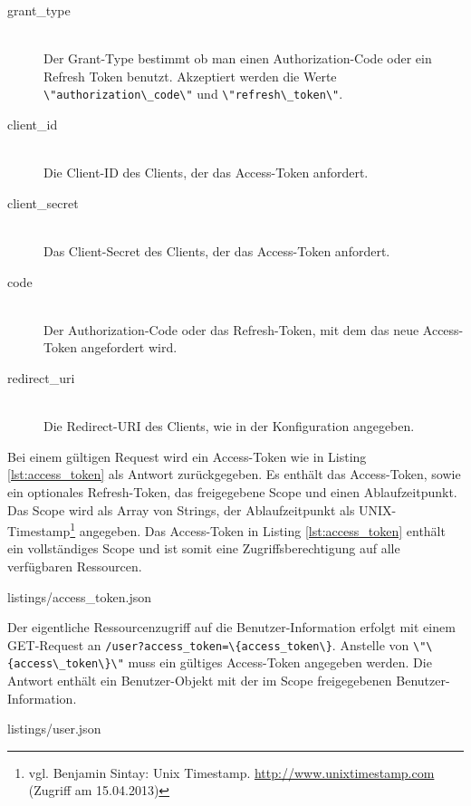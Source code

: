 \documentclass[12pt,a4paper,pointednumbers,abstracton]{scrartcl}
\newcommand{\code}[1]{\small\lstinline[style=InlinePHP]!#1!\normalsize}
\begin{document}
\begin{description}
	\item[grant\_type] \hfill \\
		Der Grant-Type bestimmt ob man einen Authorization-Code oder ein Refresh Token benutzt.
		Akzeptiert werden die Werte \code{\"authorization\_code\"} und \code{\"refresh\_token\"}.
	\item[client\_id] \hfill \\
		Die Client-ID des Clients, der das Access-Token anfordert.
	\item[client\_secret] \hfill \\
		Das Client-Secret des Clients, der das Access-Token anfordert.
	\item[code] \hfill \\
		Der Authorization-Code oder das Refresh-Token, mit dem das neue Access-Token angefordert wird.
	\item[redirect\_uri] \hfill \\
		Die Redirect-URI des Clients, wie in der Konfiguration angegeben.
\end{description}

Bei einem gültigen Request wird ein Access-Token wie in Listing \ref{lst:access_token} als Antwort zurückgegeben.
Es enthält das Access-Token, sowie ein optionales Refresh-Token, das freigegebene Scope und einen Ablaufzeitpunkt.
Das Scope wird als Array von Strings, der Ablaufzeitpunkt als UNIX-Timestamp\footnote{vgl. Benjamin Sintay: Unix Timestamp. \url{http://www.unixtimestamp.com} (Zugriff am 15.04.2013)} angegeben.
Das Access-Token in Listing \ref{lst:access_token} enthält ein vollständiges Scope und ist somit eine Zugriffsberechtigung auf alle verfügbaren Ressourcen.

\begin{minipage}{\textwidth}
	
	{listings/access_token.json}
\end{minipage}

Der eigentliche Ressourcenzugriff auf die Benutzer-Information erfolgt mit einem GET-Request an \code{/user?access_token=\{access_token\}}.
Anstelle von \code{\"\{access\_token\}\"} muss ein gültiges Access-Token angegeben werden.
Die Antwort enthält ein Benutzer-Objekt mit der im Scope freigegebenen Benutzer-Information.

\begin{minipage}{\textwidth}
	
	{listings/user.json}
\end{minipage}
\end{document}
